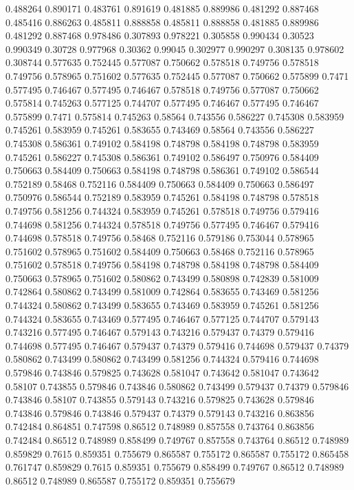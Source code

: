 0.488264 0.890171
0.483761 0.891619
0.481885 0.889986
0.481292 0.887468
0.485416 0.886263
0.485811 0.888858
0.485811 0.888858
0.481885 0.889986
0.481292 0.887468
0.978486 0.307893
0.978221 0.305858
0.990434 0.30523
0.990349 0.30728
0.977968 0.30362
0.99045 0.302977
0.990297 0.308135
0.978602 0.308744
0.577635 0.752445
0.577087 0.750662
0.578518 0.749756
0.578518 0.749756
0.578965 0.751602
0.577635 0.752445
0.577087 0.750662
0.575899 0.7471
0.577495 0.746467
0.577495 0.746467
0.578518 0.749756
0.577087 0.750662
0.575814 0.745263
0.577125 0.744707
0.577495 0.746467
0.577495 0.746467
0.575899 0.7471
0.575814 0.745263
0.58564 0.743556
0.586227 0.745308
0.583959 0.745261
0.583959 0.745261
0.583655 0.743469
0.58564 0.743556
0.586227 0.745308
0.586361 0.749102
0.584198 0.748798
0.584198 0.748798
0.583959 0.745261
0.586227 0.745308
0.586361 0.749102
0.586497 0.750976
0.584409 0.750663
0.584409 0.750663
0.584198 0.748798
0.586361 0.749102
0.586544 0.752189
0.58468 0.752116
0.584409 0.750663
0.584409 0.750663
0.586497 0.750976
0.586544 0.752189
0.583959 0.745261
0.584198 0.748798
0.578518 0.749756
0.581256 0.744324
0.583959 0.745261
0.578518 0.749756
0.579416 0.744698
0.581256 0.744324
0.578518 0.749756
0.577495 0.746467
0.579416 0.744698
0.578518 0.749756
0.58468 0.752116
0.579186 0.753044
0.578965 0.751602
0.578965 0.751602
0.584409 0.750663
0.58468 0.752116
0.578965 0.751602
0.578518 0.749756
0.584198 0.748798
0.584198 0.748798
0.584409 0.750663
0.578965 0.751602
0.580862 0.743499
0.580898 0.742839
0.581009 0.742864
0.580862 0.743499
0.581009 0.742864
0.583655 0.743469
0.581256 0.744324
0.580862 0.743499
0.583655 0.743469
0.583959 0.745261
0.581256 0.744324
0.583655 0.743469
0.577495 0.746467
0.577125 0.744707
0.579143 0.743216
0.577495 0.746467
0.579143 0.743216
0.579437 0.74379
0.579416 0.744698
0.577495 0.746467
0.579437 0.74379
0.579416 0.744698
0.579437 0.74379
0.580862 0.743499
0.580862 0.743499
0.581256 0.744324
0.579416 0.744698
0.579846 0.743846
0.579825 0.743628
0.581047 0.743642
0.581047 0.743642
0.58107 0.743855
0.579846 0.743846
0.580862 0.743499
0.579437 0.74379
0.579846 0.743846
0.58107 0.743855
0.579143 0.743216
0.579825 0.743628
0.579846 0.743846
0.579846 0.743846
0.579437 0.74379
0.579143 0.743216
0.863856 0.742484
0.864851 0.747598
0.86512 0.748989
0.857558 0.743764
0.863856 0.742484
0.86512 0.748989
0.858499 0.749767
0.857558 0.743764
0.86512 0.748989
0.859829 0.7615
0.859351 0.755679
0.865587 0.755172
0.865587 0.755172
0.865458 0.761747
0.859829 0.7615
0.859351 0.755679
0.858499 0.749767
0.86512 0.748989
0.86512 0.748989
0.865587 0.755172
0.859351 0.755679

